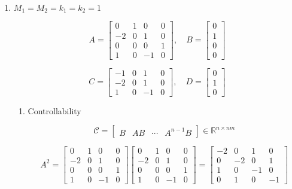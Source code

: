 \documentclass{article}
\begin{document}
\begin{enumerate}[label=\alph*)]
    \item $M_1 = M_2 = k_1 = k_2 = 1$

    \[
    A = 
    \begin{bmatrix}
        0 & 1 & 0 & 0 \\
        -2 & 0 & 1 & 0 \\
        0 & 0 & 0 & 1 \\
        1 & 0 & -1 & 0
    \end{bmatrix}
    , \quad B = 
    \begin{bmatrix}
        0 \\
        1 \\
        0 \\
        0
    \end{bmatrix}
    \]
     
    \[ 
    C = 
    \begin{bmatrix}
        -1 & 0 & 1 & 0 \\
        -2 & 0 & 1 & 0 \\
        1 & 0 & -1 & 0
    \end{bmatrix} 
    , \quad D = 
    \begin{bmatrix}
        0 \\
        1 \\
        0
    \end{bmatrix}
    \]

    \begin{enumerate}[label=\roman*)]
        \item Controllability
        
        \[
        \mathcal{C} = 
        \begin{bmatrix}
            B & AB & \cdots & A^{n-1}B
        \end{bmatrix}
        \in \mathbb{R}^{n \times nm}
        \]

        \[
        A^2 = 
        \begin{bmatrix}
            0 & 1 & 0 & 0 \\
            -2 & 0 & 1 & 0 \\
            0 & 0 & 0 & 1 \\
            1 & 0 & -1 & 0
        \end{bmatrix}
        \begin{bmatrix}
            0 & 1 & 0 & 0 \\
            -2 & 0 & 1 & 0 \\
            0 & 0 & 0 & 1 \\
            1 & 0 & -1 & 0
        \end{bmatrix}
        =
        \begin{bmatrix}
            -2 & 0 & 1 & 0 \\
            0 & -2 & 0 & 1 \\
            1 & 0 & -1 & 0 \\
            0 & 1 & 0 & -1
        \end{bmatrix}
        \]


\end{enumerate}
\end{enumerate}
\end{document}
